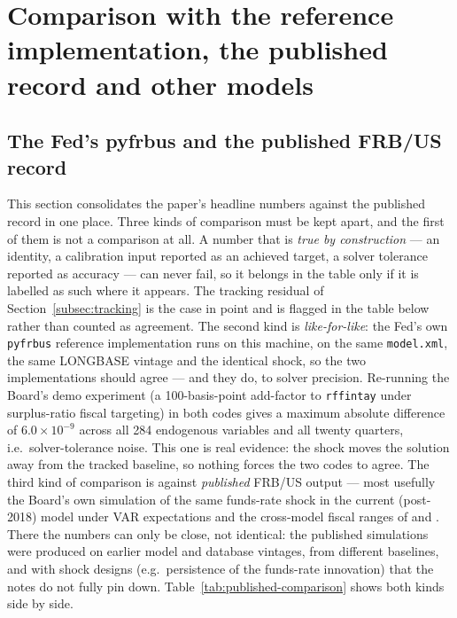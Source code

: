 \section{Comparison with the reference implementation, the published record and other models}
\label{sec:comparison}

\subsection{The Fed's pyfrbus and the published FRB/US record}
\label{sec:cmp-published}

This section consolidates the paper's headline numbers against the published record in one place. Three kinds of comparison must be kept apart, and the first of them is not a comparison at all. A number that is \emph{true by construction} --- an identity, a calibration input reported as an achieved target, a solver tolerance reported as accuracy --- can never fail, so it belongs in the table only if it is labelled as such where it appears. The tracking residual of Section~\ref{subsec:tracking} is the case in point and is flagged in the table below rather than counted as agreement. The second kind is \emph{like-for-like}: the Fed's own \texttt{pyfrbus} reference implementation runs on this machine, on the same \texttt{model.xml}, the same LONGBASE vintage and the identical shock, so the two implementations should agree --- and they do, to solver precision. Re-running the Board's demo experiment (a 100-basis-point add-factor to \texttt{rffintay} under surplus-ratio fiscal targeting) in both codes gives a maximum absolute difference of $6.0\times10^{-9}$ across all 284 endogenous variables and all twenty quarters, i.e.\ solver-tolerance noise. This one is real evidence: the shock moves the solution away from the tracked baseline, so nothing forces the two codes to agree. The third kind of comparison is against \emph{published} FRB/US output --- most usefully the Board's own simulation of the same funds-rate shock in the current (post-2018) model under VAR expectations \citep[Fig.~2]{laforte2018changes} and the cross-model fiscal ranges of \citet{coenen2012effects} and \citet{whalen2015fiscal}. There the numbers can only be close, not identical: the published simulations were produced on earlier model and database vintages, from different baselines, and with shock designs (e.g.\ persistence of the funds-rate innovation) that the notes do not fully pin down. Table~\ref{tab:published-comparison} shows both kinds side by side.

